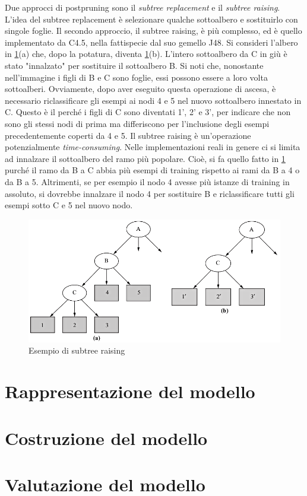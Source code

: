 Due approcci di postpruning sono il \textit{subtree replacement} e il \textit{subtree raising}. L'idea del subtree replacement è selezionare qualche sottoalbero e sostituirlo con singole foglie. Il secondo approccio, il subtree raising, è più complesso, ed è quello implementato da C4.5, nella fattispecie dal suo gemello J48\cite{Witten:2011:DMP:1972514}. Si consideri l'albero in \ref{fig:subtree}(a) che, dopo la potatura, diventa \ref{fig:subtree}(b). L'intero sottoalbero da C in giù è stato "innalzato" per sostituire il sottoalbero B. Si noti che, nonostante nell'immagine i figli di B e C sono foglie, essi possono essere a loro volta sottoalberi. Ovviamente, dopo aver eseguito questa operazione di ascesa, è necessario riclassificare gli esempi ai nodi 4 e 5 nel nuovo sottoalbero innestato in C. Questo è il perché i figli di C sono diventati 1', 2' e 3', per indicare che non sono gli stessi nodi di prima ma differiscono per l'inclusione degli esempi precedentemente coperti da 4 e 5.
Il subtree raising è un'operazione potenzialmente \textit{time-consuming}. Nelle implementazioni reali in genere ci si limita ad innalzare il sottoalbero del ramo più popolare. Cioè, si fa quello fatto in \ref{fig:subtree} purché il ramo da B a C abbia più esempi di training rispetto ai rami da B a 4 o da B a 5. Altrimenti, se per esempio il nodo 4 avesse più istanze di training in assoluto, si dovrebbe innalzare il nodo 4 per sostituire B e riclassificare tutti gli esempi sotto C e 5 nel nuovo nodo.
\begin{figure}[!hbtp]
	\centering
	\includegraphics[width=\textwidth,height=\textheight,keepaspectratio]{./images/subtree_raising}
	\caption{Esempio di subtree raising}
	\label{fig:subtree}
\end{figure}

\section{Rappresentazione del modello}
%
%

\section{Costruzione del modello}

\section{Valutazione del modello}